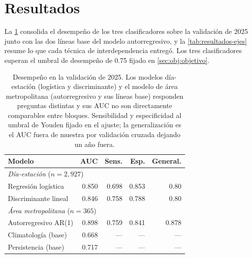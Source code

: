 \section{Resultados}
\label{sec:resultados}

La \cref{tab:resultados} consolida el desempeño de los tres clasificadores
sobre la validación de 2025 junto con las dos líneas base del modelo
autorregresivo, y la \cref{tab:resultados-ejes} resume lo que cada técnica
de interdependencia entregó. Los tres clasificadores superan el umbral de
desempeño de 0.75 fijado en \cref{sec:obj:objetivo}.

\begin{table}[pos=t]
  \centering
  \caption{Desempeño en la validación de 2025. Los modelos día-estación
    (logística y discriminante) y el modelo de área metropolitana
    (autorregresivo y sus líneas base) responden preguntas distintas y sus
    AUC no son directamente comparables entre bloques. Sensibilidad y
    especificidad al umbral de Youden fijado en el ajuste; la
    generalización es el AUC fuera de muestra por validación cruzada
    dejando un año fuera.}
  \label{tab:resultados}
  \small
  \begin{tabular}{lrrrr}
    \toprule
    Modelo & AUC & Sens. & Esp. & General. \\
    \midrule
    \multicolumn{5}{l}{\emph{Día-estación} ($n=2{,}927$)} \\
    Regresión logística    & 0.850 & 0.698 & 0.853 & 0.80 \\
    Discriminante lineal   & 0.846 & 0.758 & 0.788 & 0.80 \\
    \midrule
    \multicolumn{5}{l}{\emph{Área metropolitana} ($n=365$)} \\
    Autorregresivo AR(1)   & 0.898 & 0.759 & 0.841 & 0.878 \\
    Climatología (base)    & 0.668 & ---   & ---   & --- \\
    Persistencia (base)    & 0.717 & ---   & ---   & --- \\
    \bottomrule
  \end{tabular}
\end{table}

